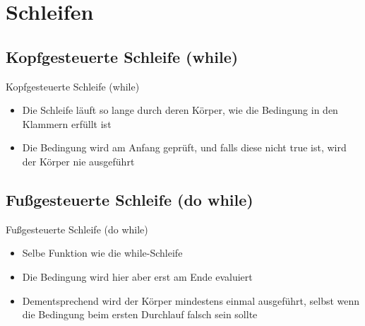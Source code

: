 \section{Schleifen}
\subsection{Kopfgesteuerte Schleife (while)}
\begin{frame}{Kopfgesteuerte Schleife (while)}
	\begin{itemize}
		\item Die Schleife läuft so lange durch deren Körper, wie die Bedingung in den Klammern erfüllt ist
		\item Die Bedingung wird am Anfang geprüft, und falls diese nicht \alert{true} ist, wird der Körper nie ausgeführt
	\end{itemize}
		
\end{frame}

\subsection{Fußgesteuerte Schleife (do while)}
\begin{frame}{Fußgesteuerte Schleife (do while)}
	\begin{itemize}
		\item Selbe Funktion wie die while-Schleife
		\item Die Bedingung wird hier aber erst am Ende evaluiert
		\item Dementsprechend wird der Körper mindestens einmal ausgeführt, selbst wenn die Bedingung beim ersten Durchlauf falsch sein sollte
	\end{itemize}
		
\end{frame}


